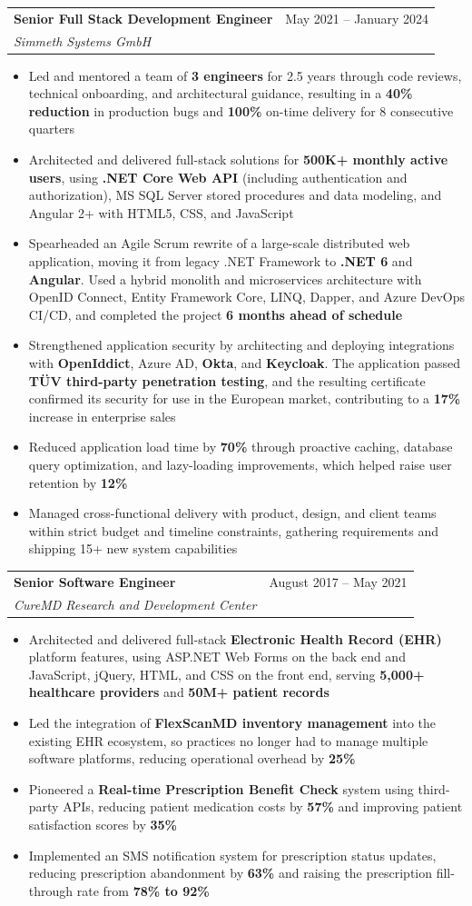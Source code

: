 \documentclass[letterpaper,11pt]{article}
\makeatletter
\newcommand{\resumeItem}[1]{
  \item\small{
    {#1 \vspace{-2pt}}
  }
}
\newcommand{\resumeSubheading}[4]{
  \vspace{-2pt}\item
    \begin{tabular*}{0.97\textwidth}[t]{l@{\extracolsep{\fill}}r}
      \textbf{#1} & #2 \\
      \textit{\small#3} & \textit{\small #4} \\
    \end{tabular*}\vspace{-7pt}
}
\newcommand{\resumeItemListStart}{\begin{itemize}}
\newcommand{\resumeItemListEnd}{\end{itemize}\vspace{-5pt}}
\makeatother
\begin{document}
    \resumeSubheading
      {Senior Full Stack Development Engineer}{May 2021 -- January 2024}
      {Simmeth Systems GmbH}{}
      \resumeItemListStart
        \resumeItem{Led and mentored a team of \textbf{3 engineers} for 2.5 years through code reviews, technical onboarding, and architectural guidance, resulting in a \textbf{40\% reduction} in production bugs and \textbf{100\%} on-time delivery for 8 consecutive quarters}
        \resumeItem{Architected and delivered full-stack solutions for \textbf{500K+ monthly active users}, using \textbf{.NET Core Web API} (including authentication and authorization), MS SQL Server stored procedures and data modeling, and Angular 2+ with HTML5, CSS, and JavaScript}
        \resumeItem{Spearheaded an Agile Scrum rewrite of a large-scale distributed web application, moving it from legacy .NET Framework to \textbf{.NET 6} and \textbf{Angular}. Used a hybrid monolith and microservices architecture with OpenID Connect, Entity Framework Core, LINQ, Dapper, and Azure DevOps CI/CD, and completed the project \textbf{6 months ahead of schedule}}
        \resumeItem{Strengthened application security by architecting and deploying integrations with \textbf{OpenIddict}, Azure AD, \textbf{Okta}, and \textbf{Keycloak}. The application passed \textbf{TÜV third-party penetration testing}, and the resulting certificate confirmed its security for use in the European market, contributing to a \textbf{17\%} increase in enterprise sales}
        \resumeItem{Reduced application load time by \textbf{70\%} through proactive caching, database query optimization, and lazy-loading improvements, which helped raise user retention by \textbf{12\%}}
        \resumeItem{Managed cross-functional delivery with product, design, and client teams within strict budget and timeline constraints, gathering requirements and shipping 15+ new system capabilities}
      \resumeItemListEnd

    \resumeSubheading
      {Senior Software Engineer}{August 2017 -- May 2021}
      {CureMD Research and Development Center}{}
      \resumeItemListStart
        \resumeItem{Architected and delivered full-stack \textbf{Electronic Health Record (EHR)} platform features, using ASP.NET Web Forms on the back end and JavaScript, jQuery, HTML, and CSS on the front end, serving \textbf{5,000+ healthcare providers} and \textbf{50M+ patient records}}
        \resumeItem{Led the integration of \textbf{FlexScanMD inventory management} into the existing EHR ecosystem, so practices no longer had to manage multiple software platforms, reducing operational overhead by \textbf{25\%}}
        \resumeItem{Pioneered a \textbf{Real-time Prescription Benefit Check} system using third-party APIs, reducing patient medication costs by \textbf{57\%} and improving patient satisfaction scores by \textbf{35\%}}
        \resumeItem{Implemented an SMS notification system for prescription status updates, reducing prescription abandonment by \textbf{63\%} and raising the prescription fill-through rate from \textbf{78\% to 92\%}}
      \resumeItemListEnd
\end{document}
